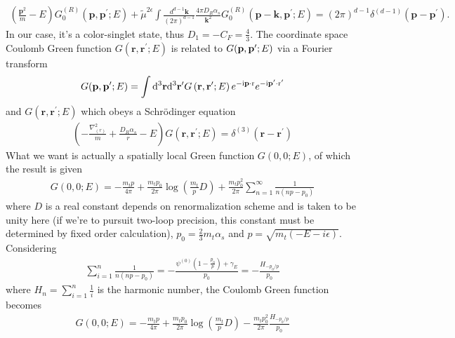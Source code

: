 \documentclass[english,aps,prd,preprint,showpacs,superscriptaddress,groupedaddress,fixfloats]{revtex4-1}
\begin{document}
\begin{align}
	\left(\frac{\mathbf{p}^{2}}{m}-E\right) G_{0}^{(R)}\left(\mathbf{p}, \mathbf{p}^{\prime} ; E\right)+\tilde{\mu}^{2 \epsilon} \int \frac{d^{d-1} \mathbf{k}}{(2 \pi)^{d-1}} \frac{4 \pi D_{R} \alpha_{s}}{\mathbf{k}^{2}} G_{0}^{(R)}\left(\mathbf{p}-\mathbf{k}, \mathbf{p}^{\prime} ; E\right) =(2 \pi)^{d-1} \delta^{(d-1)}\left(\mathbf{p}-\mathbf{p}^{\prime}\right).
\end{align}
In our case, it's a color-singlet state, thus $D_1=-C_F=\frac{4}{3}$. The coordinate space Coulomb Green function $G\left(\mathbf{r}, \mathbf{r}^{\prime}; E\right)$ is related to $G(\vb{p},\vb{p}';E)$ via a Fourier transform
\begin{align}
	G(\mathbf{p},\vb{p}' ; E)=\int \mathrm{d}^{3} \mathbf{r}\dd^3 \vb{r}' G\left(\mathbf{r}, \mathbf{r}^{\prime}; E\right) e^{-\mathrm{i} \mathbf{p}\cdot \mathrm{r}}e^{-\mathrm{i} \mathbf{p}' \cdot\mathrm{r}'}
\end{align}
and $G\left(\mathbf{r}, \mathbf{r}^{\prime}; E\right)$ which obeys a Schr\"odinger equation
\begin{align}
	\left(-\frac{\nabla_{(r)}^{2}}{m}+\frac{D_{R} \alpha_{s}}{r}-E\right) G\left(\mathbf{r}, \mathbf{r}^{\prime} ; E\right)=\delta^{(3)}\left(\mathbf{r}-\mathbf{r}^{\prime}\right)
\end{align}
What we want is actually a spatially local Green function $G(0,0;E)$, of which the result is given\cite{Fadin1987,Melnikov:1994jb}
\begin{align}
	G(0,0 ; E)=-\frac{m_{t} p}{4 \pi}+\frac{m_{t} p_{0}}{2 \pi} \log \left(\frac{m_{t}}{p} D\right)+\frac{m_{t} p_{0}^{2}}{2 \pi} \sum_{n=1}^{\infty} \frac{1}{n\left(n p-p_{0}\right)}
\end{align}
where $D$ is a real constant depends on renormalization scheme and is taken to be unity here (if we're to pursuit two-loop precision, this constant must be determined by fixed order calculation), $p_0=\frac{2}{3}m_t\alpha_s$ and $p=\sqrt{m_t\left( -E-i\epsilon \right)}$. Considering
\begin{align}
	\sum_{i=1}^{n} \frac{1}{n\left(n p-p_{0}\right)}=-\frac{\psi^{(0)}\left(1-\frac{p_{0}}{p}\right)+\gamma_E}{p_{0}}=-\frac{H_{-p_{0}/p}}{p_{0}}
\end{align}
where $H_n=\sum_{i=1}^n\frac{1}{i}$ is the harmonic number, the Coulomb Green function becomes
\begin{align}
	G(0,0 ; E)=-\frac{m_{t} p}{4 \pi}+\frac{m_{t} p_{0}}{2 \pi} \log \left(\frac{m_{t}}{p} D\right)-\frac{m_{t} p_{0}^{2}}{2 \pi}\frac{H_{-p_{0}/p}}{p_{0}}
	\label{G}
\end{align}
\end{document}
